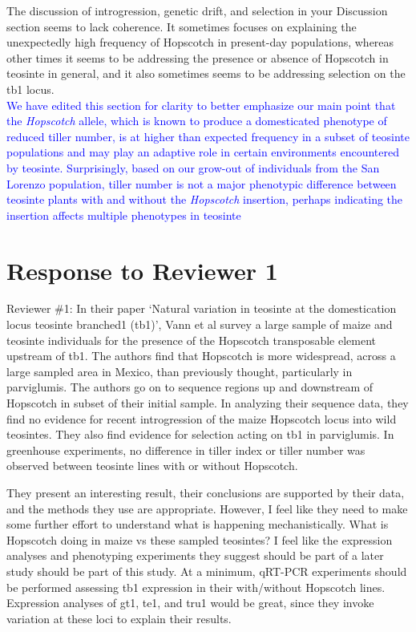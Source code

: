 \documentclass[11pt]{article}
\newcommand{\res}[1]{\noindent \textcolor{blue}{{#1}} \\}
\begin{document}
The discussion of introgression, genetic drift, and selection in your Discussion section seems to lack coherence.  It sometimes focuses on explaining the unexpectedly high frequency of Hopscotch in present-day populations, whereas other times it seems to be addressing the presence or absence of Hopscotch in teosinte in general, and it also sometimes seems to be addressing selection on the tb1 locus.\\ 

\res{We have edited this section for clarity to better emphasize our main point that the \emph{Hopscotch} allele, which is known to produce a domesticated phenotype of reduced tiller number, is at higher than expected frequency in a subset of teosinte populations and may play an adaptive role in certain environments encountered by teosinte.  
Surprisingly, based on our grow-out of individuals from the San Lorenzo population, tiller number is not a major phenotypic difference between teosinte plants with and without the \emph{Hopscotch} insertion, perhaps indicating the insertion affects multiple phenotypes in teosinte}

\section*{Response to Reviewer 1}

Reviewer \#1: In their paper `Natural variation in teosinte at the domestication locus teosinte branched1 (tb1)', Vann et al survey a large sample of maize and teosinte individuals for the presence of the Hopscotch transposable element upstream of tb1. The authors find that Hopscotch is more widespread, across a large sampled area in Mexico, than previously thought, particularly in parviglumis. The authors go on to sequence regions up and downstream of Hopscotch in subset of their initial sample. In analyzing their sequence data, they find no evidence for recent introgression of the maize Hopscotch locus into wild teosintes. They also find evidence for selection acting on tb1 in parviglumis. In greenhouse experiments, no difference in tiller index or tiller number was observed between teosinte lines with or without Hopscotch. 

They present an interesting result, their conclusions are supported by their data, and the methods they use are appropriate. However, I feel like they need to make some further effort to understand what is happening mechanistically. What is Hopscotch doing in maize vs these sampled teosintes? I feel like the expression analyses and phenotyping experiments they suggest should be part of a later study should be part of this study. At a minimum, qRT-PCR experiments should be performed assessing tb1 expression in their with/without Hopscotch lines. Expression analyses of gt1, te1, and tru1 would be great, since they invoke variation at these loci to explain their results.\\
\end{document}
